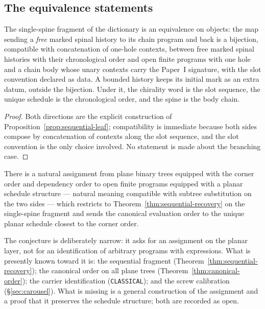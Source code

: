 \subsection{The equivalence statements}

\begin{theorem}\label{thm:sequential-recovery}
The single-spine fragment of the dictionary is an equivalence on objects: the map
sending a \emph{free} marked spinal history to its chain program and back is a
bijection, compatible with concatenation of one-hole contexts, between free marked spinal
histories with their chronological order and open finite programs with one hole and a
chain body whose unary contexts carry the Paper~I signature, with the slot convention
declared as data.  A bounded history keeps its initial mark as an extra datum, outside the
bijection.  Under it, the
chirality word is the slot sequence, the unique schedule is the chronological order,
and the spine is the body chain.
\end{theorem}

\begin{proof}
Both directions are the explicit construction of
Proposition~\ref{prop:sequential-leaf}; compatibility is immediate because both sides
compose by concatenation of contexts along the slot sequence, and the slot convention
is the only choice involved.  No statement is made about the branching case.
\end{proof}

\begin{conjecture}\label{conj:general-equivalence}
There is a natural assignment from plane binary trees equipped with the corner order
and dependency order to open finite programs equipped with a planar schedule
structure --- natural meaning compatible with subtree substitution on the two sides ---
which restricts to Theorem~\ref{thm:sequential-recovery}
on the single-spine fragment and sends the canonical evaluation order to the unique
planar schedule closest to the corner order.
\end{conjecture}

The conjecture is deliberately narrow: it asks for an assignment on the planar layer, not
for an identification of arbitrary programs with expressions.  What is presently
known toward it is: the sequential fragment (Theorem~\ref{thm:sequential-recovery});
the canonical order on all plane trees (Theorem~\ref{thm:canonical-order}); the
carrier identification (\texttt{CLASSICAL}); and the screw calibration
(\S\ref{sec:carousel}).  What is missing is a general construction of the assignment and
a proof that it preserves the schedule structure; both are recorded as open.

